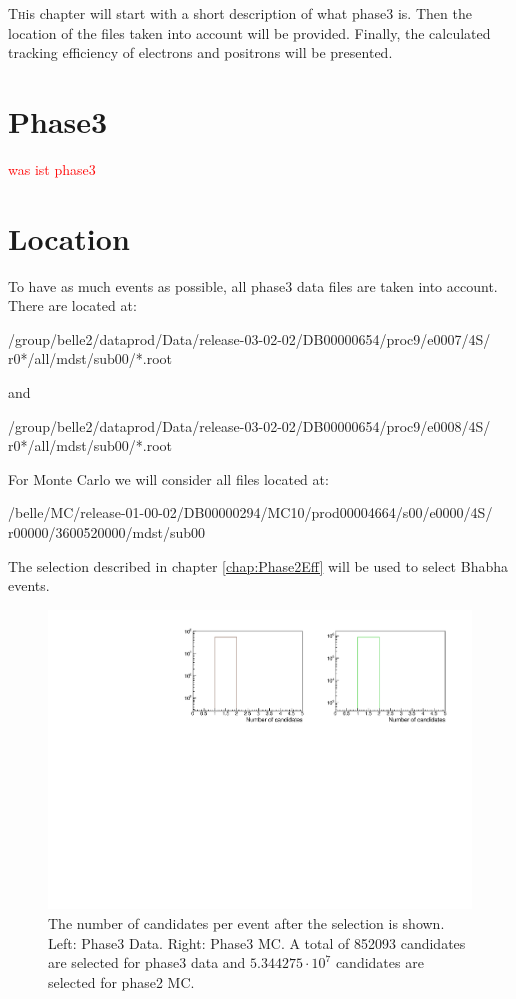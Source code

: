 \documentclass[a4paper,11pt,twosided,final,german,openbib,pdftex,listof=totoc,bibliography=totoc]{scrbook}
\begin{document}
\lettrine{T}{h}is chapter will start with a short description of what phase3 is. Then the location of the files taken into account will be provided. Finally, the calculated tracking efficiency of electrons and positrons will be presented.

\section{Phase3}
\textcolor{red}{was ist phase3}

\section{Location}

To have as much events as possible, all phase3 data files are taken into account. There are located at:

/group/belle2/dataprod/Data/release-03-02-02/DB00000654/proc9/e0007/4S/
r0*/all/mdst/sub00/*.root

and

/group/belle2/dataprod/Data/release-03-02-02/DB00000654/proc9/e0008/4S/
r0*/all/mdst/sub00/*.root
\newline


For Monte Carlo we will consider all files located at:




/belle/MC/release-01-00-02/DB00000294/MC10/prod00004664/s00/e0000/4S/
r00000/3600520000/mdst/sub00
\newline

The selection described in chapter \ref{chap:Phase2Eff} will be used to select Bhabha events.



\begin{figure}[h!]
	\includegraphics[width=\textwidth]{Plots/master3/CCandP3.pdf}
	\caption[Total Number Of Events After The Selection Phase3]{The number of candidates per event after the selection is shown. Left: Phase3 Data. Right: Phase3 MC. A total of 852093 candidates are selected for phase3 data and $5.344275\cdot10^7$ candidates are selected for phase2 MC.}
	\label{fig:nCandAS3}
\end{figure}
\end{document}
